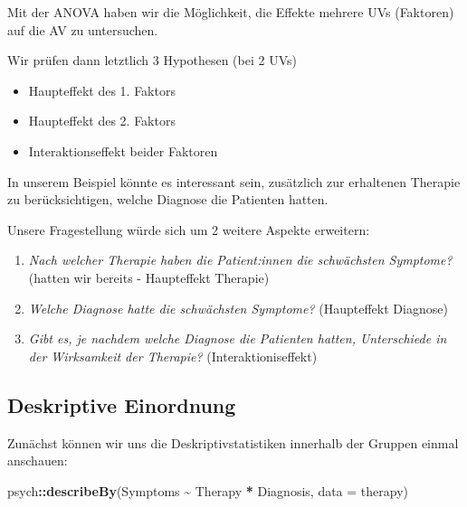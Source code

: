 \documentclass[
]{book}
\newenvironment{Shaded}{\begin{snugshade}}{\end{snugshade}}
\newcommand{\AttributeTok}[1]{\textcolor[rgb]{0.13,0.29,0.53}{#1}}
\newcommand{\FunctionTok}[1]{\textcolor[rgb]{0.13,0.29,0.53}{\textbf{#1}}}
\newcommand{\NormalTok}[1]{#1}
\newcommand{\SpecialCharTok}[1]{\textcolor[rgb]{0.81,0.36,0.00}{\textbf{#1}}}
\providecommand{\tightlist}{%
  \setlength{\itemsep}{0pt}\setlength{\parskip}{0pt}}
\begin{document}
Mit der ANOVA haben wir die Möglichkeit, die Effekte mehrere UVs (Faktoren) auf die AV zu untersuchen.

Wir prüfen dann letztlich 3 Hypothesen (bei 2 UVs)

\begin{itemize}
\tightlist
\item
  Haupteffekt des 1. Faktors
\item
  Haupteffekt des 2. Faktors
\item
  Interaktionseffekt beider Faktoren
\end{itemize}

In unserem Beispiel könnte es interessant sein, zusätzlich zur erhaltenen Therapie zu berücksichtigen, welche Diagnose die Patienten hatten.

Unsere Fragestellung würde sich um 2 weitere Aspekte erweitern:

\begin{enumerate}
\def\labelenumi{\arabic{enumi}.}
\tightlist
\item
  \emph{Nach welcher Therapie haben die Patient:innen die schwächsten Symptome?} (hatten wir bereits - Haupteffekt Therapie)
\item
  \emph{Welche Diagnose hatte die schwächsten Symptome?} (Haupteffekt Diagnose)
\item
  \emph{Gibt es, je nachdem welche Diagnose die Patienten hatten, Unterschiede in der Wirksamkeit der Therapie?} (Interaktioniseffekt)
\end{enumerate}

\subsection{Deskriptive Einordnung}\label{deskriptive-einordnung-5}

Zunächst können wir uns die Deskriptivstatistiken innerhalb der Gruppen einmal anschauen:

\begin{Shaded}
\begin{Highlighting}[]
\NormalTok{psych}\SpecialCharTok{::}\FunctionTok{describeBy}\NormalTok{(Symptoms }\SpecialCharTok{\textasciitilde{}}\NormalTok{ Therapy }\SpecialCharTok{*}\NormalTok{ Diagnosis, }\AttributeTok{data =}\NormalTok{ therapy)}
\end{Highlighting}
\end{Shaded}
\end{document}
